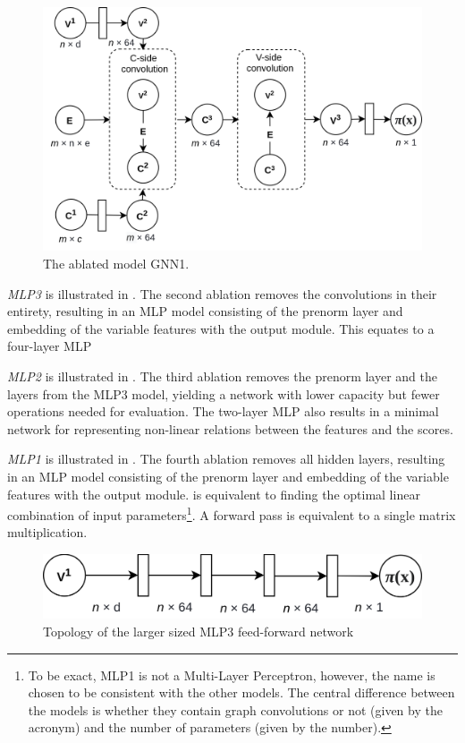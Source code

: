 \begin{figure}
    \centering
    \includegraphics[width=\linewidth]{img/gnn_1.png}
    \caption{The ablated model GNN1.}
    \label{fig:gnn1}
\end{figure}

\textit{\gls{MLP}3} is illustrated in . The second ablation removes the convolutions in their entirety, resulting in an \gls{MLP} model consisting of the prenorm layer and embedding of the variable features with the output module. This equates to a four-layer \gls{MLP}


\textit{\gls{MLP}2} is illustrated in . The third ablation removes the prenorm layer and the layers from the MLP3 model, yielding a network with lower capacity but fewer operations needed for evaluation. The two-layer \gls{MLP} also results in a minimal network for representing non-linear relations between the features and the scores. 


\textit{\gls{MLP}1} is illustrated in . The fourth ablation removes all hidden layers, resulting in an \gls{MLP} model consisting of the prenorm layer and embedding of the variable features with the output module. is equivalent to finding the optimal linear combination of input parameters\footnote{To be exact, MLP1 is not a Multi-Layer Perceptron, however, the name is chosen to be consistent with the other models. The central difference between the models is whether they contain graph convolutions or not (given by the acronym) and the number of parameters (given by the number).}. A forward pass is equivalent to a single matrix multiplication. 


\begin{figure}
    \centering
    \includegraphics[width=0.7\linewidth]{img/mlp3.png}
    \caption{Topology of the larger sized MLP3 feed-forward network}
    \label{fig:topo_mlp3}
\end{figure}

